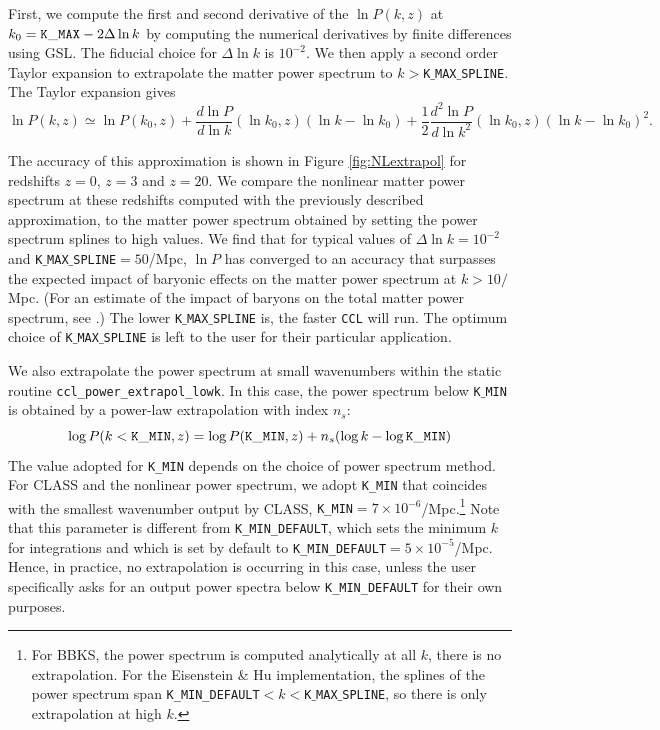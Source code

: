 \documentclass[\docopts]{\docclass}
\newcommand{\ccl}{{\tt CCL}\xspace}
\begin{document}
First, we compute the first and second derivative of the $\ln P(k,z)$ at $k_0={\rm \tt K\_MAX}-2\Delta\ln k$ by computing the numerical derivatives by finite differences using GSL. The fiducial choice for $\Delta\ln k$ is $10^{-2}$. We then apply a second order Taylor expansion to extrapolate the matter power spectrum to $k>${\tt K$\_$MAX$\_$SPLINE}. The Taylor expansion gives
%
\begin{equation}
  \ln P(k,z) \simeq \ln P(k_0,z) + \frac{d\ln P}{d\ln k}(\ln k_0,z) (\ln k-\ln k_0)  + \frac{1}{2}  \frac{d^2\ln P}{d\ln k^2}(\ln k_0,z) (\ln k-\ln k_0)^2.
  \label{eq:NLPSTaylor}
\end{equation}

The accuracy of this approximation is shown in Figure \ref{fig:NLextrapol} for redshifts $z=0$, $z=3$ and $z=20$. We compare the nonlinear matter power spectrum at these redshifts computed with the previously described approximation, to the matter power spectrum obtained by setting the power spectrum splines to high values. We find that for typical values of $\Delta \ln k=10^{-2}$ and {\tt K$\_$MAX$\_$SPLINE}$=50$/Mpc, $\ln P$ has converged to an accuracy that surpasses the expected impact of baryonic effects on the matter power spectrum at $k>10/$Mpc.  (For an estimate of the impact of baryons on the total matter power spectrum, see \citealt{Schneider15}.) The lower {\tt K$\_$MAX$\_$SPLINE} is, the faster \ccl will run. The optimum choice of {\tt K$\_$MAX$\_$SPLINE} is left to the user for their particular application.

We also extrapolate the power spectrum at small wavenumbers within the static routine {\tt ccl\_power\_extrapol\_lowk}. In this case, the power spectrum below {\tt K$\_$MIN} is obtained by a power-law extrapolation with index $n_s$:
\begin{equation}
  \log P(k<{\tt K\_MIN},z) = \log P({\tt K\_MIN},z) + n_s (\log k-\log{\tt K\_MIN})
\end{equation}
The value adopted for {\tt K\_MIN} depends on the choice of power spectrum method. For CLASS and the nonlinear power spectrum, we adopt {\tt K\_MIN} that coincides with the smallest wavenumber output by CLASS, {\tt K\_MIN}$=7\times 10^{-6}$/Mpc.\footnote{For BBKS, the power spectrum is computed analytically at all $k$, there is no extrapolation. For the Eisenstein \& Hu implementation, the splines of the power spectrum span {\tt K\_MIN\_DEFAULT}$<k<${\tt K$\_$MAX$\_$SPLINE}, so there is only extrapolation at high $k$.} Note that this parameter is different from {\tt K\_MIN\_DEFAULT}, which sets the minimum $k$ for integrations and which is set by default to {\tt K\_MIN\_DEFAULT}$=5\times 10^{-5}$/Mpc. Hence, in practice, no extrapolation is occurring in this case, unless the user specifically asks for an output power spectra below {\tt K\_MIN\_DEFAULT} for their own purposes.
\end{document}
